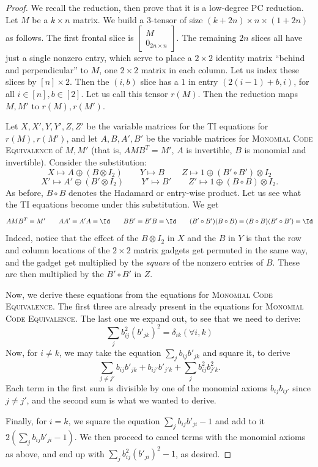 \begin{proof}
We recall the reduction, then prove that it is a low-degree PC reduction. Let $M$ be a $k \times n$ matrix. We build a 3-tensor of size $(k+2n) \times n \times (1 + 2n)$ as follows. The first frontal slice is $\begin{bmatrix} M \\ 0_{2n \times n} \end{bmatrix}$. The remaining $2n$ slices all have just a single nonzero entry, which serve to place a $2 \times 2$ identity matrix ``behind and perpendicular'' to $M$, one $2 \times 2$ matrix in each column. Let us index these slices by $[n] \times 2$. Then the $(i,b)$ slice has a $1$ in entry $(2(i-1) + b, i)$, for all $i \in [n], b \in [2]$. Let us call this tensor $r(M)$. Then the reduction maps $M,M'$ to $r(M), r(M')$.

Let $X,X',Y,Y',Z,Z'$ be the variable matrices for the \textsc{TI} equations for $r(M), r(M')$, and let $A,B,A',B'$ be the variable matrices for \textsc{Monomial Code Equivalence} of $M,M'$ (that is, $AMB^T = M'$, $A$ is invertible, $B$ is monomial and invertible). Consider the substitution:
\[
X \mapsto A \oplus (B \otimes I_2) \qquad Y \mapsto B \qquad Z \mapsto 1 \oplus (B' \circ B') \otimes I_2
\]
\[
X' \mapsto A' \oplus (B' \otimes I_2) \qquad Y' \mapsto B' \qquad Z' \mapsto 1 \oplus (B \circ B) \otimes I_2.
\]
As before, $B \circ B$ denotes the Hadamard or entry-wise product. Let us see what the \textsc{TI} equations become under this substitution. We get
\[
AMB^T = M' \qquad AA' = A'A = \Id \qquad BB' = B'B = \Id \qquad (B' \circ B')(B \circ B) = (B \circ B)(B' \circ B') = \Id
\]
Indeed, notice that the effect of the $B \otimes I_2$ in $X$ and the $B$ in $Y$ is that the row and column locations of the $2 \times 2$ matrix gadgets get permuted in the same way, and the gadget get multiplied by the \emph{square} of the nonzero entries of $B$. These are then multiplied by the $B' \circ B'$ in $Z$.

Now, we derive these equations from the equations for \textsc{Monomial Code Equivalence}. The first three are already present in the equations for \textsc{Monomial Code Equivalence}. The last one we expand out, to see that we need to derive:
\[
\sum_{j} b_{ij}^2 (b'_{jk})^2 = \delta_{ik} (\forall i,k)
\]
Now, for $i \neq k$, we may take the equation $\sum_j b_{ij} b'_{jk}$ and square it, to derive
\[
\sum_{j \neq j'} b_{ij} b'_{jk} + b_{ij'} b'_{j'k} + \sum_j b_{ij}^2 b_{j'k}^2.
\]
Each term in the first sum is divisible by one of the monomial axioms $b_{ij} b_{ij'}$ since $j \neq j'$, and the second sum is what we wanted to derive.

Finally, for $i = k$, we square the equation $\sum_j b_{ij} b'_{ji} - 1$ and add to it $2 \left(\sum_j b_{ij} b'_{ji} -1 \right)$. We then proceed to cancel terms with the monomial axioms as above, and end up with $\sum_j b_{ij}^2 (b'_{ji})^2 - 1$, as desired.
\end{proof}
